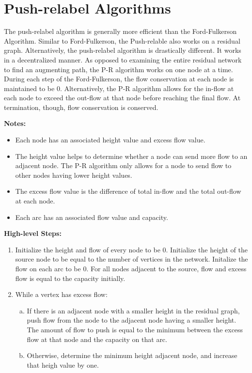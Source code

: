 \documentclass[12pt]{article}
\theoremstyle{definition}
\begin{document}
\section{Push-relabel Algorithms}

The push-relabel algorithm is generally more efficient than the Ford-Fulkerson Algorithm.  Similar to Ford-Fulkerson, the Push-relable also works on a residual graph. Alternatively, the push-relabel algorithm is drastically different. It works in a decentralized manner. As opposed to examining the entire residual network to find an augmenting path, the P-R algorithm works on one node at a time. During each step of the Ford-Fulkerson, the flow conservation at each node is maintained to be 0. Alternatively, the P-R algorithm allows for the in-flow at each node to exceed the out-flow at that node before reaching the final flow. At termination, though, flow conservation is conserved. 

\textbf{Notes:}

\begin{itemize}
	\item Each node has an associated height value and excess flow value. 
	\item The height value helps to determine whether a node can send more flow to an adjacent node. The P-R algorithm only allows for a node to send flow to other nodes having lower height values.
	\item The excess flow value is the difference of total in-flow and the total out-flow at each node.
	\item Each arc has an associated flow value and capacity.
\end{itemize}

\textbf{High-level Steps:}

\begin{enumerate}
	\item Initialize the height and flow of every node to be 0. Initialize the height of the source node to be equal to the number of vertices in the network. Initalize the flow on each arc to be 0. For all nodes adjacent to the source, flow and excess flow is equal to the capacity initially.
	\item While a vertex has excess flow:
	\begin{enumerate}[a.]
		\item If there is an adjacent node with a smaller height in the residual graph, push flow from the node to the adjacent node having a smaller height. The amount of flow to push is equal to the minimum between the excess flow at that node and the capacity on that arc.
		\item Otherwise, determine the minimum height adjacent node, and increase that heigh value by one.
	\end{enumerate}
	
\end{enumerate}
\end{document}
